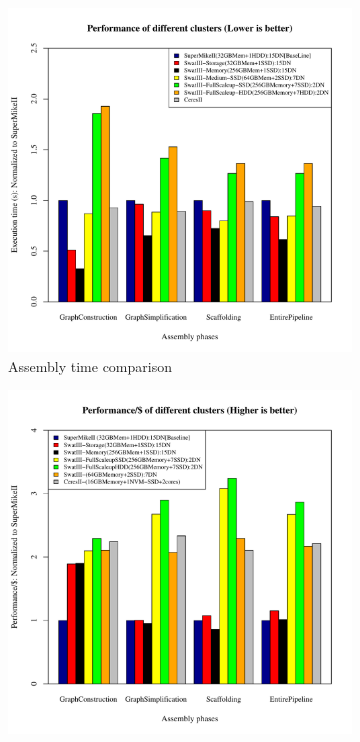 \documentclass[conference]{IEEEtran}
\begin{document}
\begin{figure}[h]
        \begin{subfigure}[b]{0.23\textwidth}
                \includegraphics[width=\textwidth]{Figure/PerormanceData/Plots/DifferentArchitectures.pdf}
                \caption{Assembly time comparison}
                \label{fig:DifferentArchitecturesPerf}
        \end{subfigure}
        \begin{subfigure}[b]{0.23\textwidth}
                \includegraphics[width=\textwidth]{Figure/PerormanceData/Plots/PerfPerDollar.pdf}

\end{subfigure}
\end{figure}
\end{document}
